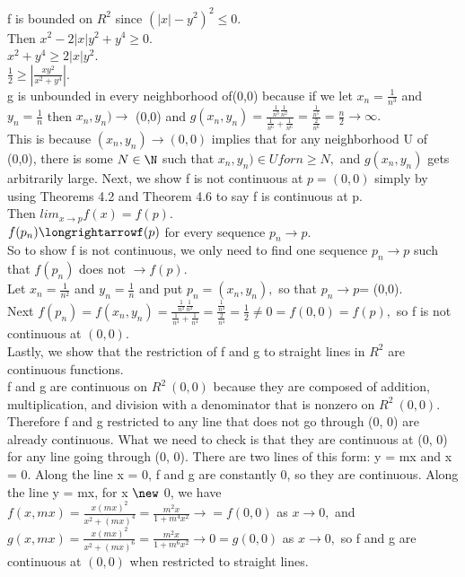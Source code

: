 f is bounded on $R^2$ since $(|x|-y^2)^2 \leq 0.$ \\ 
Then $x^2-2|x|y^2+y^4 \geq 0.$ \\ 
$x^2+y^4 \geq 2|x|y^2.$\\ 
$\frac{1}{2}\geq |\frac{xy^2}{x^2+y^4}|.$ \\
g is unbounded in every neighborhood of(0,0) because if we let $x_n=\frac{1}{n^3}$ and $y_n=\frac{1}{n}$ then $x_n,y_n) \longrightarrow$ (0,0) and $g(x_n,y_n)=\frac{\frac{1}{n^3}\frac{1}{n^2}}{\frac{1}{n^6}+\frac{1}{n^6}}=\frac{\frac{1}{n^5}}{\frac{2}{n^6}}=\frac{n}{2} \longrightarrow \infty.$ \\ 
This is because $(x_n,y_n) \longrightarrow (0,0)$ implies that for any neighborhood U of (0,0), there is some $N \in \N$ such that $x_n,y_n) \in U for n \geq N,$ and $g(x_n,y_n)$ gets arbitrarily large. Next, we show f is not continuous at $p=(0,0)$ simply by using Theorems 4.2 and Theorem 4.6 to say f is continuous at p. \\ 
Then $lim_{x \longrightarrow p}f(x)=f(p).$ \\ 
$f(p_n)\longrightarrowf(p)$ for every sequence $p_n \longrightarrow p.$ \\ 
So to show f is not continuous, we only need to find one sequence $p_n \longrightarrow p $ such that $f(p_n)$ does not $\longrightarrow f(p).$ \\ 
Let $x_n=\frac{1}{n^2}$ and $y_n=\frac{1}{n}$ and put $p_n=(x_n,y_n),$ so that $p_n \longrightarrow p$= (0,0). \\ 
Next $f(p_n)=f(x_n,y_n)=\frac{\frac{1}{n^2}\frac{1}{n^2}}{\frac{1}{n^4}+\frac{1}{n^4}}=\frac{\frac{1}{n^4}}{\frac{2}{n^4}}=\frac{1}{2}\neq 0=f(0,0)=f(p),$ so f is not continuous at $(0,0).$ \\ 
Lastly, we show that the restriction of f and g to straight lines in $R^2$ are continuous functions. \\ 
f and g are continuous on $R^2\ {(0,0)}$ because they are composed of addition, multiplication, and division with a denominator that is nonzero on $R^2\ {(0,0)}.$ \\ 
Therefore f and g restricted to any line that does not go through (0, 0) are already continuous. What we need to
check is that they are continuous at (0, 0) for any line going through (0, 0). There are two lines of
this form: y = mx and x = 0. Along the line x = 0, f and g are constantly 0, so they are continuous.
Along the line y = mx, for x $\new$ 0, we have 
$f(x,mx)=\frac{x(mx)^2}{x^2+(mx)^4}=\frac{m^2x}{1+m^4x^2} \longrightarrow= f(0,0)$ as $x \longrightarrow 0,$ and $g(x,mx)=\frac{x(mx)^2}{x^2+(mx)^6}=\frac{m^2x}{1+m^6x^2} \longrightarrow 0 =g(0,0)$ as $x \longrightarrow 0,$ so f and g are continuous at $(0,0)$ when restricted to straight lines. 


